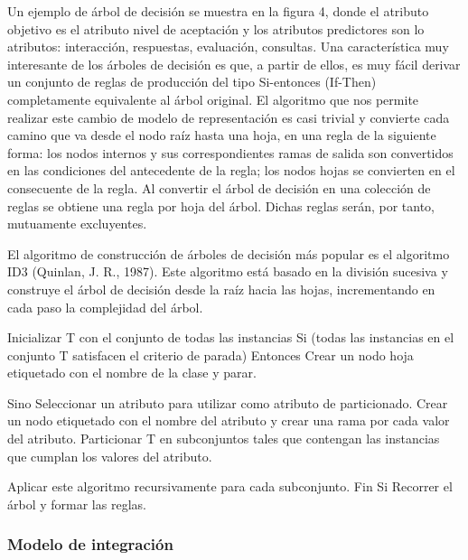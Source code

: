 \begin{itemize}
Un ejemplo de árbol de decisión se muestra en la figura 4, donde el
atributo objetivo es el atributo nivel de aceptación y los atributos predictores
son lo atributos: interacción, respuestas, evaluación, consultas. Una
característica muy interesante de los árboles de decisión es que, a
partir de ellos, es muy fácil derivar un conjunto de reglas de producción del
tipo Si-entonces (If-Then) completamente equivalente al árbol original. El
algoritmo que nos permite realizar este cambio de modelo de representación
es casi trivial y convierte cada camino que va desde el nodo raíz hasta una
hoja, en una regla de la siguiente forma: los nodos internos y sus correspondientes
ramas de salida son convertidos en las condiciones del antecedente de la regla; los nodos hojas se convierten en el consecuente de la regla. Al convertir el árbol de decisión en una colección de reglas se obtiene una regla por hoja del árbol. Dichas reglas serán, por tanto, mutuamente excluyentes.

El algoritmo de construcción de árboles de decisión más popular es el algoritmo ID3 (Quinlan, J. R., 1987). Este algoritmo está basado en la división sucesiva y construye el árbol de decisión desde la raíz hacia las hojas, incrementando en cada paso la complejidad del árbol.

Inicializar T con el conjunto de todas las instancias Si (todas las instancias en el conjunto T satisfacen el criterio de parada) Entonces Crear un nodo hoja etiquetado con el nombre de la clase y  parar.

Sino Seleccionar un atributo para utilizar como atributo de particionado.
Crear un nodo etiquetado con el nombre del atributo y crear una rama por cada valor del atributo.
Particionar T en subconjuntos tales que contengan las instancias que cumplan los valores del atributo.

Aplicar este algoritmo recursivamente para cada subconjunto.
Fin Si Recorrer el árbol y formar las reglas.


\subsubsection{Modelo de integración}


\end{itemize}
